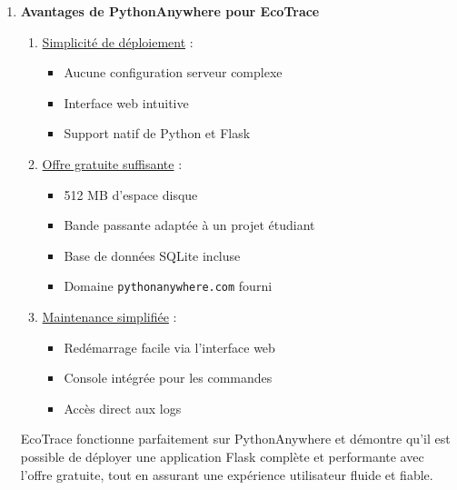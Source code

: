 \documentclass[a4paper,11pt]{article}
\begin{document}
\begin{enumerate}
                    \item \textbf{Avantages de PythonAnywhere pour EcoTrace}
                        \begin{enumerate}
                            \item \underline{Simplicité de déploiement} :
                                \begin{itemize}
                                    \item Aucune configuration serveur complexe
                                    \item Interface web intuitive
                                    \item Support natif de Python et Flask
                                \end{itemize}
                            \item \underline{Offre gratuite suffisante} :
                                \begin{itemize}
                                    \item 512 MB d'espace disque
                                    \item Bande passante adaptée à un projet étudiant
                                    \item Base de données SQLite incluse
                                    \item Domaine \texttt{pythonanywhere.com} fourni
                                \end{itemize}
                            \item \underline{Maintenance simplifiée} :
                                \begin{itemize}
                                    \item Redémarrage facile via l'interface web
                                    \item Console intégrée pour les commandes
                                    \item Accès direct aux logs
                                \end{itemize}
                        \end{enumerate}
                    
                        \noindent EcoTrace fonctionne parfaitement sur PythonAnywhere et démontre qu'il est possible de déployer une application Flask complète et performante avec l'offre gratuite, tout en assurant une expérience utilisateur fluide et fiable.
                \end{enumerate}
\end{document}

